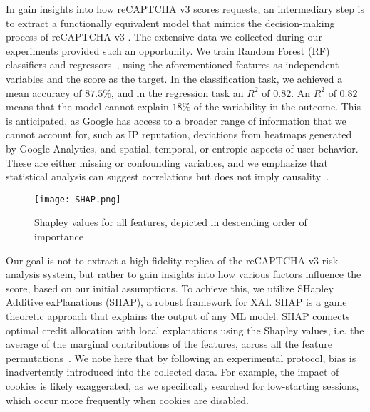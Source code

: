 In gain insights into how reCAPTCHA v3 scores requests, an intermediary step is to extract a functionally equivalent model that mimics the decision-making process of reCAPTCHA v3 \cite{jagielski2020high, bastani2017interpreting}.
The extensive data we collected during our experiments provided such an opportunity.
We train Random Forest (\gls{RF}) classifiers and regressors~\cite{liaw2002classification}, using the aforementioned features as independent variables and the score as the target.
In the classification task, we achieved a mean accuracy of $87.5\%$, and in the regression task an $R^2$ of $0.82$. 
An $R^2$ of $0.82$ means that the model cannot explain $18\%$ of the variability in the outcome.
This is anticipated, as Google has access to a broader range of information that we cannot account for, such as IP reputation, deviations from heatmaps generated by Google Analytics, and spatial, temporal, or entropic aspects of user behavior.
These are either missing or confounding variables, and we emphasize that statistical analysis can suggest correlations but does not imply causality~\cite{scholkopf2019causality}.

\begin{figure}[b]
\centerline{\texttt{[image: SHAP.png]}}
\caption{Shapley values for all features, depicted in descending order of importance}
\label{shap}
\end{figure}

Our goal is not to extract a high-fidelity replica of the reCAPTCHA v3 risk analysis system, but rather to gain insights into how various factors influence the score, based on our initial assumptions.
To achieve this, we utilize SHapley Additive exPlanations (SHAP), a robust framework for  \gls{XAI}.
SHAP is a game theoretic approach that explains the output of any \gls{ML} model.
SHAP connects optimal credit allocation with local explanations using the Shapley values, i.e. the average of the marginal contributions of the features, across all the feature permutations~\cite{lundberg2017unified}.
We note here that by following an experimental protocol, bias is inadvertently introduced into the collected data.
For example, the impact of cookies is likely exaggerated, as we specifically searched for low-starting sessions, which occur more frequently when cookies are disabled.

